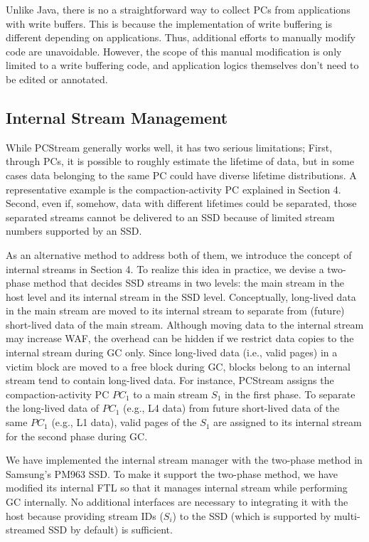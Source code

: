 Unlike Java, there is no a straightforward way to collect PCs from applications
with write buffers. This is because the implementation of write buffering is
different depending on applications. Thus, additional efforts to manually
modify code are unavoidable. However, the scope of this manual modification is
only limited to a write buffering code, and application logics themselves don't
need to be edited or annotated.

\subsection{Internal Stream Management}
While \textsf{PCStream} generally works well, it has two serious limitations;
First, through PCs, it is possible to roughly estimate the lifetime of data,
but in some cases data belonging to the same PC could have diverse lifetime
distributions.  A representative example is the compaction-activity PC
explained in Section 4. Second, even if, somehow, data with different lifetimes
could be separated, those separated streams cannot be delivered to an SSD
because of limited stream numbers supported by an SSD.

As an alternative method to address both of them, we introduce the concept of
internal streams in Section 4. To realize this idea in practice, we devise a
two-phase method that decides SSD streams in two levels: the main stream in the
host level and its internal stream in the SSD level.  Conceptually, long-lived
data in the main stream are moved to its internal stream to separate from
(future) short-lived data of the main stream.  Although moving data to the
internal stream may increase WAF, the overhead can be hidden if we restrict
data copies to the internal stream during GC only.  Since long-lived data
(i.e., valid pages) in a victim block are moved to a free block during GC,
blocks belong to an internal stream tend to contain long-lived data.  For
instance, \textsf{\small PCStream} assigns the compaction-activity PC {\it
$PC_1$} to a main stream {\it $S_1$} in the first phase.  To separate the
long-lived data of {\it $PC_1$} (e.g., L4 data) from future short-lived data of
the same {\it $PC_1$} (e.g., L1 data), valid pages of the {\it $S_1$} are
assigned to its internal stream for the second phase during GC.

{\color{blue}
We have implemented the internal stream manager with the two-phase method in
Samsung's PM963 SSD. To make it support the two-phase method, we
have modified its internal FTL so that it manages internal stream while
performing GC internally. No additional interfaces are necessary to integrating
it with the host because providing stream IDs (\textit{$S_i$}) to the SSD (which
is supported by multi-streamed SSD by default) is sufficient.
}



